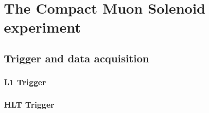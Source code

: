 \chapter{The Compact Muon Solenoid experiment \label{chap:CMS}}



\section{Trigger and data acquisition}

\subsection{L1 Trigger}

\subsection{HLT Trigger \label{sec:cms_hlt}}

